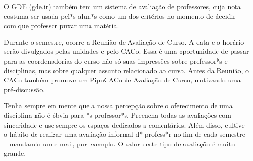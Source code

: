 O GDE (\url{gde.ir}) também tem um sistema de avaliação de professores, cuja
nota costuma ser usada pel*s alun*s como um dos critérios no momento de decidir
com que professor puxar uma matéria.

Durante o semestre, ocorre a Reunião de Avaliação de Curso. A data e o horário
serão divulgados pelas unidades e pelo CACo. Essa é uma oportunidade de passar
para as coordenadorias do curso não só suas impressões sobre professor*s e
disciplinas, mas sobre qualquer assunto relacionado ao curso. Antes da Reunião,
o CACo também promove um PipoCACo de Avaliação de Curso, motivando uma
pré-discussão.

Tenha sempre em mente que a nossa percepção sobre o oferecimento de uma
disciplina não é óbvia para *s professor*s. Preencha todas as avaliações com
sinceridade e use sempre os espaços dedicados a comentários. Além disso, cultive
o hábito de realizar uma avaliação informal d* profess*r no fim de cada semestre
-- mandando um e-mail, por exemplo. O valor deste tipo de avaliação é muito
grande.
